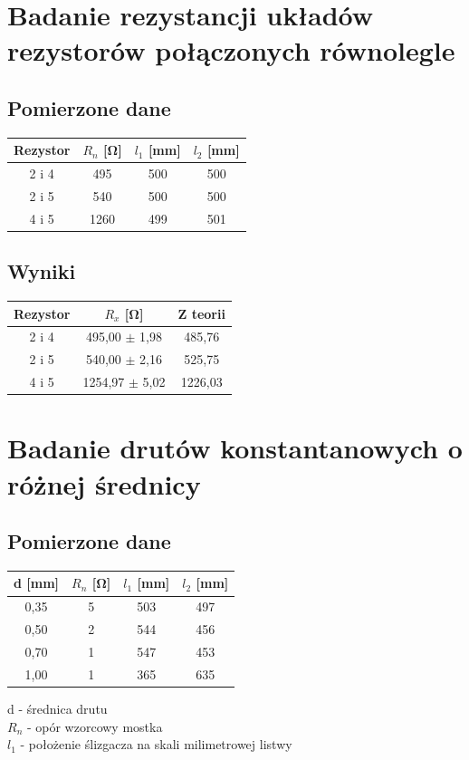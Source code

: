 \documentclass{article}
\begin{document}
\section{Badanie rezystancji układów rezystorów połączonych równolegle}
\subsection{Pomierzone dane}
\begin{center}
\begin{tabular}{ c |  c | c | c}
Rezystor & $R_n$ [\si{\ohm}] & $l_1$ [mm] & $l_2$ [mm]\\
\hline
 2 i 4 & 495 & 500 & 500\\ 
 2 i 5 & 540 & 500 & 500\\ 
 4 i 5 & 1260 & 499 & 501\\ 
\end{tabular}
\end{center}


\subsection{Wyniki}
\begin{center}
\begin{tabular}{ c | c | c}
Rezystor & $R_x$ [\si{\ohm}] & Z teorii\\
\hline
2 i 4    & 495,00 $\pm$ 1,98 & 485,76\\ 
2 i 5  & 540,00 $\pm$ 2,16 & 525,75\\ 
4 i 5    & 1254,97 $\pm$ 5,02 &  1226,03\\ 

\end{tabular}
\end{center}

\section{Badanie drutów konstantanowych o różnej średnicy}
\subsection{Pomierzone dane}

\begin{center}
\begin{tabular}{ c |  c | c | c}
d [mm] & $R_n$ [\si{\ohm}] & $l_1$ [mm] & $l_2$ [mm]\\
\hline
 0,35 & 5 & 503 & 497\\ 
 0,50 & 2 & 544 & 456\\ 
 0,70 & 1 & 547 & 453\\ 
 1,00 & 1 & 365 & 635\\ 

\end{tabular}
\end{center}
{d} - średnica drutu\\
$R_n$ - opór wzorcowy mostka\\ 
$l_1$ - położenie ślizgacza na skali milimetrowej listwy\\
\end{document}
